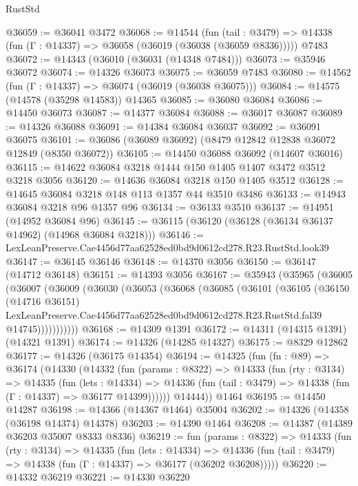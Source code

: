 \begin{lexlean}{RustStd}
\begin{coremodule}
@36059 := @36041 @3472
@36068 := @14544
    (fun (tail : @3479) => @14338 (fun (Γ : @14337) => @36058 (@36019 (@36038 (@36059 @8336)))))
    @7483
@36072 := @14343 (@36010 (@36031 (@14348 @7484)))
@36073 := @35946 @36072
@36074 := @14326 @36073
@36075 := @36059 @7483
@36080 := @14562 (fun (Γ : @14337) => @36074 (@36019 (@36038 @36075)))
@36084 := @14575 (@14578 (@35298 @14583)) @14365
@36085 := @36080 @36084
@36086 := @14450 @36073
@36087 := @14377 @36084
@36088 := @36017 @36087
@36089 := @14326 @36088
@36091 := @14384 @36084 @36037
@36092 := @36091 @36075
@36101 := @36086 (@36089 @36092) (@8479 @12842 @12838 @36072 @12849 (@8350 @36072))
@36105 := @14450 @36088 @36092 (@14607 @36016)
@36115 := @14622 @36084 @3218 @1444 @150 @1405 @1407 @3472 @3512 @3218 @3056
@36120 := @14636 @36084 @3218 @150 @1405 @3512
@36128 := @14645 @36084 @3218 @148 @113 @1357 @44 @3510 @3486
@36133 := @14943 @36084 @3218 @96 @1357 @96
@36134 := @36133 @3510
@36137 := @14951 (@14952 @36084 @96)
@36145 := @36115 (@36120 (@36128 (@36134 @36137 @14962) (@14968 @36084 @3218)))
@36146 := LexLeanPreserve.Cae4456d77aa62528ed0bd9d0612cd278.R23.RustStd.look39
@36147 := @36145 @36146
@36148 := @14370 @3056
@36150 := @36147 (@14712 @36148)
@36151 := @14393 @3056
@36167 := @35943
    (@35965
      (@36005
        (@36007
          (@36009
            (@36030
              (@36053
                (@36068
                  (@36085
                    (@36101
                      (@36105
                        (@36150
                          (@14716 @36151)
                          LexLeanPreserve.Cae4456d77aa62528ed0bd9d0612cd278.R23.RustStd.fal39
                          @14745)))))))))))
@36168 := @14309 @1391
@36172 := @14311 (@14315 @1391) (@14321 @1391)
@36174 := @14326 (@14285 @14327)
@36175 := @8329 @12862
@36177 := @14326 (@36175 @14354)
@36194 := @14325
    (fun (fn : @89) =>
    @36174
      (@14330
        (@14332
          (fun (params : @8322) =>
          @14333
            (fun (rty : @3134) =>
            @14335
              (fun (lets : @14334) =>
              @14336 (fun (tail : @3479) => @14338 (fun (Γ : @14337) => @36177 @14399))))))
        @14444))
    @1464
@36195 := @14450 @14287
@36198 := @14366 (@14367 @1464) @35004
@36202 := @14326 (@14358 (@36198 @14374) @14378)
@36203 := @14390 @1464
@36208 := @14387 (@14389 @36203 @35007 @8333 @8336)
@36219 := fun (params : @8322) =>
  @14333
    (fun (rty : @3134) =>
    @14335
      (fun (lets : @14334) =>
      @14336 (fun (tail : @3479) => @14338 (fun (Γ : @14337) => @36177 (@36202 @36208)))))
@36220 := @14332 @36219
@36221 := @14330 @36220

\end{coremodule}
\end{lexlean}
